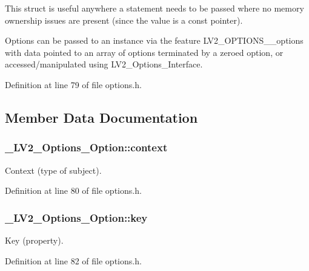 This struct is useful anywhere a statement needs to be passed where no memory ownership issues are present (since the value is a const pointer).

Options can be passed to an instance via the feature L\+V2\+\_\+\+O\+P\+T\+I\+O\+N\+S\+\_\+\+\_\+options with data pointed to an array of options terminated by a zeroed option, or accessed/manipulated using L\+V2\+\_\+\+Options\+\_\+\+Interface. 

Definition at line 79 of file options.\+h.



\subsection{Member Data Documentation}
\subsubsection[{\texorpdfstring{context}{context}}]{ \+\_\+\+L\+V2\+\_\+\+Options\+\_\+\+Option\+::context}\hypertarget{struct___l_v2___options___option_a4a7c51a412bd98f3315fc85d8126a098}{}\label{struct___l_v2___options___option_a4a7c51a412bd98f3315fc85d8126a098}
Context (type of subject). 

Definition at line 80 of file options.\+h.

\subsubsection[{\texorpdfstring{key}{key}}]{ \+\_\+\+L\+V2\+\_\+\+Options\+\_\+\+Option\+::key}\hypertarget{struct___l_v2___options___option_ad833966cb37c120e0457c95685f37e08}{}\label{struct___l_v2___options___option_ad833966cb37c120e0457c95685f37e08}
Key (property). 

Definition at line 82 of file options.\+h.

